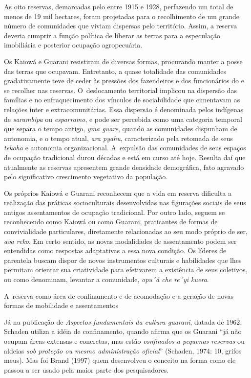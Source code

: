 As oito reservas, demarcadas pelo  entre 1915 e 1928, perfazendo um
total de menos de 19 mil hectares, foram projetadas para o recolhimento
de um grande número de comunidades que viviam dispersas pelo
território. Assim, a reserva deveria cumprir a função política de
liberar as terras para a especulação imobiliária e posterior ocupação
agropecuária. 

Os Kaiowá e Guarani resistiram de diversas formas, procurando manter a
posse das terras que ocupavam. Entretanto, a quase totalidade das
comunidades gradativamente teve de ceder às pressões dos fazendeiros e
dos funcionários do  e se recolher nas reservas. O~deslocamento
territorial implicou na dispersão das famílias e no enfraquecimento dos
vínculos de sociabilidade que cimentavam as relações inter e
extracomunitárias. Essa dispersão é denominada pelos indígenas de
\emph{sarambipa} ou \emph{esparramo}, e pode ser percebida como uma categoria
temporal que separa o tempo antigo, \emph{yma guare}, quando as comunidades
dispunham de autonomia, e o tempo atual, \emph{ara pyahu}, caracterizado pela
retomada de seus \emph{tekoha} e autonomia organizacional. A~expulsão das
comunidades de seus espaços de ocupação tradicional durou décadas e
está em curso até hoje. Resulta daí que atualmente as reservas
apresentem grande densidade demográfica, fato agravado pelo
significativo crescimento vegetativo da população.

Os próprios Kaiowá e Guarani reconhecem que a vida em reserva dificulta
a realização das práticas socioculturais desenvolvidas nas figurações
sociais de seus antigos assentamentos de ocupação tradicional. Por
outro lado, seguem se reconhecendo como Kaiowá ou como Guarani,
praticantes de formas de convivialidade particulares, diretamente
relacionadas ao seu modo próprio de ser, \emph{ava reko}. Em certo sentido, as
novas modalidades de assentamento podem ser entendidas como respostas
adaptativas a essa nova condição. Os líderes de parentela buscam dispor
de novos instrumentos culturais e habilidades que lhes permitam
orientar sua criatividade para efetivarem a existência de seus
coletivos, ou como denominam, levantar a comunidade, \emph{opu´ã che re´yi
kuera}.

A~reserva como área de confinamento e de acomodação e a geração de novas
formas de mobilidade e assentamentos

Já na publicação de \emph{Aspectos fundamentais da cultura guarani}, datada de
1962, Schaden utiliza a idéia de confinamento, quando afirma que os
Guarani ``já não ocupam áreas extensas e concretas, mas estão \emph{confinados
a pequenas reservas} ou aldeias \emph{sob proteção ou mesmo administração
oficial}'' (Schaden, 1974: 10, grifos meus). Mas foi Brand (1997) quem
desenvolveu o conceito na forma como ele passou a ser usado pela maior
parte dos pesquisadores.

